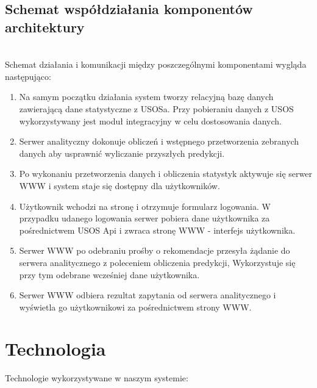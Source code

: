 \documentclass[licencjacka]{pracamgr}
\begin{document}
\section{Schemat współdziałania komponentów architektury}
~\\ \indent
Schemat działania i komunikacji między poszczególnymi komponentami wygląda następująco:
\begin{enumerate}

\item Na samym początku działania system tworzy relacyjną bazę danych zawierającą dane statystyczne z USOSa. Przy pobieraniu danych z USOS wykorzystywany jest moduł integracyjny w celu dostosowania danych.

\item Serwer analityczny dokonuje obliczeń i wstępnego przetworzenia zebranych danych aby usprawnić wyliczanie przyszłych predykcji.

\item Po wykonaniu przetworzenia danych i obliczenia statystyk aktywuje się serwer WWW i system staje się dostępny dla użytkowników.

\item Użytkownik wchodzi na stronę i otrzymuje formularz logowania. W przypadku udanego logowania serwer pobiera dane użytkownika za pośrednictwem USOS Api i zwraca stronę WWW - interfejs użytkownika.

\item Serwer WWW po odebraniu prośby o rekomendacje przesyła żądanie do serwera analitycznego z poleceniem obliczenia predykcji, Wykorzystuje się przy tym odebrane wcześniej dane użytkownika.

\item Serwer WWW odbiera rezultat zapytania od serwera analitycznego i wyświetla go użytkownikowi za pośrednictwem strony WWW.

\end{enumerate}


 \chapter{Technologia}
Technologie wykorzystywane w naszym systemie: \par
\end{document}
